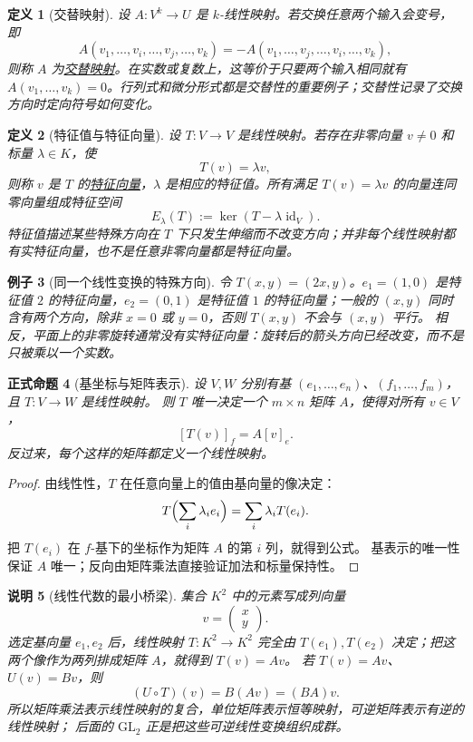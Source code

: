 \documentclass[UTF8,fontset=none,a4paper,11pt]{ctexart}
\theoremstyle{foundation-definition}
\newtheorem{definition}{定义}[section]
\theoremstyle{foundation-theorem}
\theoremstyle{foundation-proposition}
\newtheorem{proposition}[definition]{正式命题}
\theoremstyle{foundation-example}
\newtheorem{example}[definition]{例子}
\theoremstyle{foundation-remark}
\newtheorem{remark}[definition]{说明}
\theoremstyle{foundation-theorem}
\newcommand{\term}[2]{\hyperref[#1]{#2}}
\begin{document}
\begin{definition}[交替映射]\label{def:alternating-map}
设 \(A:V^k\to U\) 是 \(k\)-线性映射。若交换任意两个输入会变号，即
\[
A(v_1,\ldots,v_i,\ldots,v_j,\ldots,v_k)
=-A(v_1,\ldots,v_j,\ldots,v_i,\ldots,v_k),
\]
则称 \(A\) 为\term{def:alternating-map}{交替映射}。在实数或复数上，这等价于只要两个输入相同就有 \(A(v_1,\ldots,v_k)=0\)。行列式和微分形式都是交替性的重要例子；交替性记录了交换方向时定向符号如何变化。
\end{definition}

\begin{definition}[特征值与特征向量]\label{def:eigenpair}
设 \(T:V\to V\) 是线性映射。若存在非零向量 \(v\ne0\) 和标量 \(\lambda\in K\)，使
\[
T(v)=\lambda v,
\]
则称 \(v\) 是 \(T\) 的\term{def:eigenpair}{特征向量}，\(\lambda\) 是相应的特征值。所有满足
\(T(v)=\lambda v\) 的向量连同零向量组成特征空间
\[
E_\lambda(T):=\ker(T-\lambda\operatorname{id}_V).
\]
特征值描述某些特殊方向在 \(T\) 下只发生伸缩而不改变方向；并非每个线性映射都有实特征向量，也不是任意非零向量都是特征向量。
\end{definition}

\begin{example}[同一个线性变换的特殊方向]
令 \(T(x,y)=(2x,y)\)。\(e_1=(1,0)\) 是特征值 \(2\) 的特征向量，\(e_2=(0,1)\) 是特征值 \(1\) 的特征向量；一般的 \((x,y)\) 同时含有两个方向，除非 \(x=0\) 或 \(y=0\)，否则 \(T(x,y)\) 不会与 \((x,y)\) 平行。
相反，平面上的非零旋转通常没有实特征向量：旋转后的箭头方向已经改变，而不是只被乘以一个实数。
\end{example}

\begin{proposition}[基坐标与矩阵表示]\label{prop:matrix-representation}
设 \(V,W\) 分别有基 \((e_1,\dots,e_n)\)、\((f_1,\dots,f_m)\)，且 \(T:V\to W\) 是线性映射。
则 \(T\) 唯一决定一个 \(m\times n\) 矩阵 \(A\)，使得对所有 \(v\in V\)，
\[
[T(v)]_f=A[v]_e.
\]
反过来，每个这样的矩阵都定义一个线性映射。
\end{proposition}

\begin{proof}
由线性性，\(T\) 在任意向量上的值由基向量的像决定：
\[
T\Bigl(\sum_i\lambda_i e_i\Bigr)=\sum_i\lambda_iT(e_i).
\]
把 \(T(e_i)\) 在 \(f\)-基下的坐标作为矩阵 \(A\) 的第 \(i\) 列，就得到公式。
基表示的唯一性保证 \(A\) 唯一；反向由矩阵乘法直接验证加法和标量保持性。
\end{proof}

\begin{remark}[线性代数的最小桥梁]\label{def:linear-algebra-bridge}
集合 \(K^2\) 中的元素写成列向量
\[
v=\begin{pmatrix}x\\y\end{pmatrix}.
\]
选定基向量 \(e_1,e_2\) 后，线性映射 \(T:K^2\to K^2\) 完全由
\(T(e_1),T(e_2)\) 决定；把这两个像作为两列排成矩阵 \(A\)，就得到 \(T(v)=Av\)。
若 \(T(v)=Av\)、\(U(v)=Bv\)，则
\[
(U\circ T)(v)=B(Av)=(BA)v.
\]
所以矩阵乘法表示线性映射的复合，单位矩阵表示恒等映射，可逆矩阵表示有逆的线性映射；
后面的 \(\mathrm{GL}_2\) 正是把这些可逆线性变换组织成群。
\end{remark}
\end{document}
